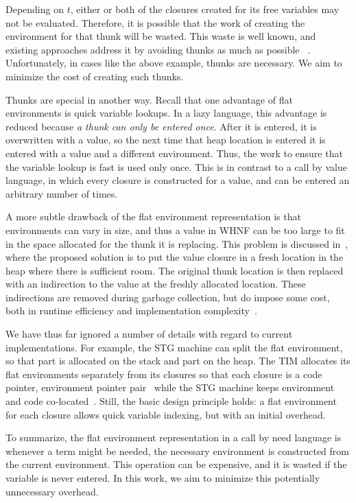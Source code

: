 Depending on $t$, either or both of the closures created for its free variables
may not be evaluated. Therefore, it is possible that the work of creating the
environment for that thunk will be wasted. This waste is well known, and
existing approaches address it by avoiding thunks as much as possible
~\cite{jonesstg,johnsson1984efficient}. Unfortunately, in cases like the above
example, thunks are necessary. We aim to minimize the cost of creating such
thunks.

Thunks are special in another way.  Recall that one advantage of flat
environments is quick variable lookups. In a lazy language, this advantage is
reduced because \emph{a thunk can only be entered once}. After it is entered, it
is overwritten with a value, so the next time that heap location is entered it
is entered with a value and a different environment. Thus, the work to ensure
that the variable lookup is fast is used only once. This is in contrast to
a call by value language, in which every closure is constructed for a value,
and can be entered an arbitrary number of times. 

A more subtle drawback of the flat environment representation is that
environments can vary in size, and thus a value in WHNF can be too large to fit
in the space allocated for the thunk it is replacing. This problem is discussed
in~\cite{jonesstg}, where the proposed solution is to put the value closure in
a fresh location in the heap where there is sufficient room. The original
thunk location is then replaced with an indirection to the value at the freshly
allocated location. These indirections are removed during garbage collection,
but do impose some cost, both in runtime efficiency and implementation
complexity~\cite{jonesstg}.

We have thus far ignored a number of details with regard to current
implementations. For example, the STG machine can split the flat environment, so
that part is allocated on the stack and part on the heap.  The TIM allocates its
flat environments separately from its closures so that each closure is a code
pointer, environment pointer pair~\cite{TIM} while the STG machine keeps
environment and code co-located~\cite{jonesstg}. Still, the basic design
principle holds: a flat environment for each closure allows quick variable
indexing, but with an initial overhead.

To summarize, the flat environment representation in a call by need language is
whenever a term might be needed, the necessary environment is constructed from
the current environment.  This operation can be expensive, and it is wasted if
the variable is never entered. In this work, we aim to minimize this potentially
unnecessary overhead.

